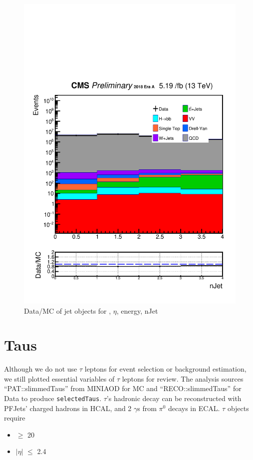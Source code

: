 \begin{figure}[h!]
  \includegraphics[width=0.47\linewidth]{figs/Data_log_AnalysisNote_MS-15_ctauS-10_nJet.pdf}
  \caption{Data/MC of jet objects for \pt, $\eta$, energy, nJet}
\end{figure}

\section{Taus}\label{sec:taus}
Although we do not use $\tau$ leptons for event selection or background estimation, we still plotted essential variables of $\tau$ leptons for review.
The analysis sources ``PAT::slimmedTaus'' from MINIAOD for MC and ``RECO::slimmedTaus'' for Data to produce {\tt selectedTaus}.
$\tau$'s hadronic decay can be reconstructed with PFJets' charged hadrons in HCAL, and 2 $\gamma$s from $\pi^{0}$ decays in ECAL.
$\tau$ objects require
\begin{itemize}
  \item \pt$\geq$ 20\GeV
  \item $|\eta|$ $\leq$ 2.4
\end{itemize}

